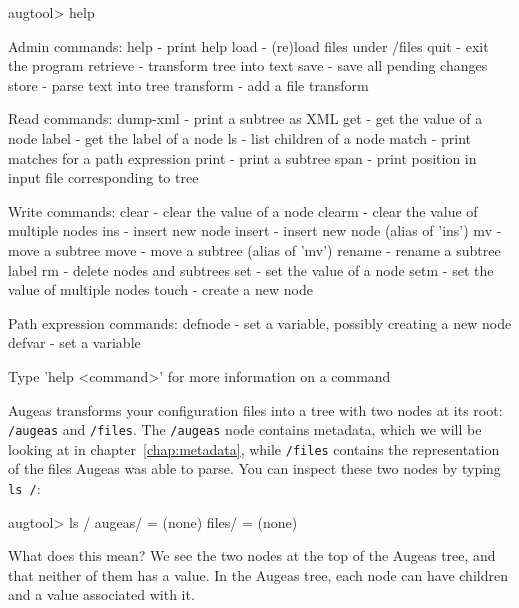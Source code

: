 \nopagebreak
\begin{augtoolsh}[]
augtool> help

Admin commands:
  help       - print help
  load       - (re)load files under /files
  quit       - exit the program
  retrieve   - transform tree into text
  save       - save all pending changes
  store      - parse text into tree
  transform  - add a file transform
\end{augtoolsh}
\begin{augtoolsh}[]
Read commands:
  dump-xml   - print a subtree as XML
  get        - get the value of a node
  label      - get the label of a node
  ls         - list children of a node
  match      - print matches for a path expression
  print      - print a subtree
  span       - print position in input file corresponding to tree
\end{augtoolsh}
\begin{augtoolsh}[]
Write commands:
  clear      - clear the value of a node
  clearm     - clear the value of multiple nodes
  ins        - insert new node
  insert     - insert new node (alias of 'ins')
  mv         - move a subtree
  move       - move a subtree (alias of 'mv')
  rename     - rename a subtree label
  rm         - delete nodes and subtrees
  set        - set the value of a node
  setm       - set the value of multiple nodes
  touch      - create a new node
\end{augtoolsh}
\begin{augtoolsh}[]
Path expression commands:
  defnode    - set a variable, possibly creating a new node
  defvar     - set a variable

Type 'help <command>' for more information on a command
\end{augtoolsh}


Augeas transforms your configuration files into a tree with two nodes at its root: \texttt{/augeas} and \texttt{/files}.
 The \texttt{/augeas} node contains metadata, which we will be looking at in chapter~\ref{chap:metadata},
 while \texttt{/files} contains the representation of the files Augeas was able to parse.
 You can inspect these two nodes by typing \verb!ls /!:


\begin{augtoolsh}[]
augtool> ls /
augeas/ = (none)
files/ = (none)
\end{augtoolsh}

What does this mean? We see the two nodes at the top of the Augeas tree, and that neither of them has a value. In the Augeas tree, each node can have children and a value associated with it.

